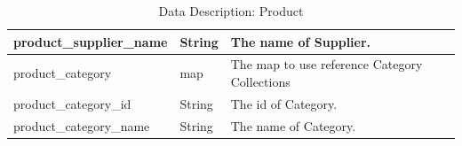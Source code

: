 \documentclass[../thesis.tex]{subfiles}
\begin{document}
\begin{center}
\begin{table}[H]
{\begin{tabular}{|l|l|l|}
                product\_supplier\_name & String        & The name of Supplier.            \\ \hline
                product\_category       & map           & The map to use reference
                Category Collections                                                       \\ \hline
                product\_category\_id   & String        & The id of Category.              \\ \hline
                product\_category\_name & String        & The name of Category.            \\ \hline
            \end{tabular}%

        }
        \caption{Data Description: Product}
        \label{tab:table-data-description-product}


    \end{table}
\end{center}
\end{document}
